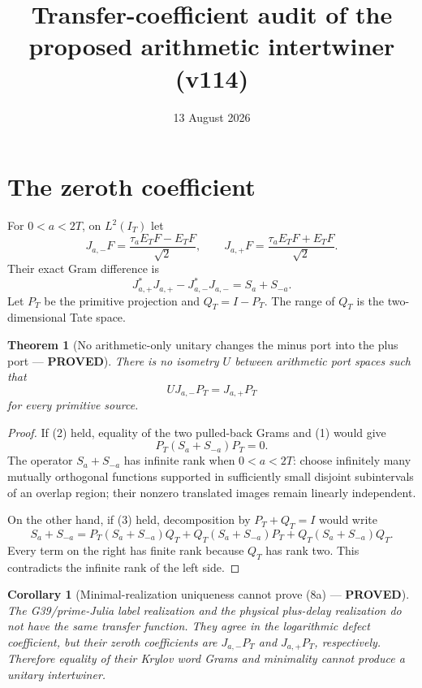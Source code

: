 \documentclass[11pt]{article}
\title{Transfer-coefficient audit of the proposed arithmetic intertwiner (v114)}
\date{13 August 2026}
\newcommand{\PROVED}{\textcolor{green!40!black}{\textbf{PROVED}}}
\newtheorem{theorem}{Theorem}
\newtheorem{corollary}{Corollary}
\begin{document}
\maketitle

\section{The zeroth coefficient}

For $0<a<2T$, on $L^2(I_T)$ let
\[
 J_{a,-}F=\frac{\tau_aE_TF-E_TF}{\sqrt2},
 \qquad
 J_{a,+}F=\frac{\tau_aE_TF+E_TF}{\sqrt2}.
\]
Their exact Gram difference is
\begin{equation}
 J_{a,+}^*J_{a,+}-J_{a,-}^*J_{a,-}=S_a+S_{-a}.                 \tag{1}
\end{equation}
Let $P_T$ be the primitive projection and $Q_T=I-P_T$.  The range of
$Q_T$ is the two-dimensional Tate space.

\begin{theorem}[No arithmetic-only unitary changes the minus port into the
plus port --- \PROVED]
There is no isometry $U$ between arithmetic port spaces such that
\begin{equation}
                         UJ_{a,-}P_T=J_{a,+}P_T                 \tag{2}
\end{equation}
for every primitive source.
\end{theorem}

\begin{proof}
If (2) held, equality of the two pulled-back Grams and (1) would give
\begin{equation}
                         P_T(S_a+S_{-a})P_T=0.                 \tag{3}
\end{equation}
The operator $S_a+S_{-a}$ has infinite rank when $0<a<2T$: choose
infinitely many mutually orthogonal functions supported in sufficiently
small disjoint subintervals of an overlap region; their nonzero translated
images remain linearly independent.

On the other hand, if (3) held, decomposition by $P_T+Q_T=I$ would write
\[
 S_a+S_{-a}=P_T(S_a+S_{-a})Q_T
            +Q_T(S_a+S_{-a})P_T
            +Q_T(S_a+S_{-a})Q_T.
\]
Every term on the right has finite rank because $Q_T$ has rank two.  This
contradicts the infinite rank of the left side.
\end{proof}

\begin{corollary}[Minimal-realization uniqueness cannot prove (8a) ---
\PROVED]
The G39/prime-Julia label realization and the physical plus-delay
realization do not have the same transfer function.  They agree in the
logarithmic defect coefficient, but their zeroth coefficients are
$J_{a,-}P_T$ and $J_{a,+}P_T$, respectively.  Therefore equality of their
Krylov word Grams and minimality cannot produce a unitary intertwiner.
\end{corollary}
\end{document}
